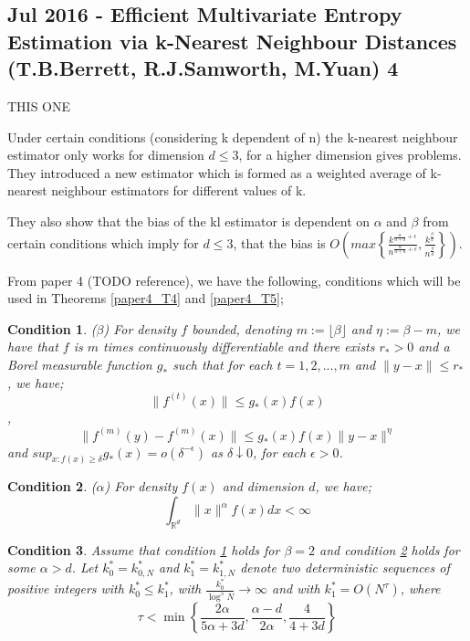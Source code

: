 \documentclass{article}
\newtheorem{remark}{Condition}
\begin{document}
\subsection{Jul 2016 - Efficient Multivariate Entropy Estimation via k-Nearest Neighbour Distances (T.B.Berrett, R.J.Samworth, M.Yuan) 4} THIS ONE

Under certain conditions (considering k dependent of n) the k-nearest neighbour estimator only works for dimension $d \leq 3$, for a higher dimension gives problems. They introduced a new estimator which is formed as a weighted average of k-nearest neighbour estimators for different values of k.

They also show that the bias of the kl estimator is dependent on $\alpha$ and $\beta$ from certain conditions which imply for $d \leq 3$,  that the bias is $O\left(max \left\{ \frac{k^{\frac{\alpha }{\alpha + d} + \epsilon}}{n^{\frac{\alpha}{\alpha + d} + \epsilon}}, \frac{k^{\frac{\beta}{d}}}{n^{\frac{\beta}{d}}} \right\} \right)$.



From paper 4 (TODO reference), we have the following, conditions which will be used in Theorems \ref{paper4_T4} and \ref{paper4_T5};
\begin{remark} ($\beta$) \label{A1}
For density $f$ bounded, denoting $m := \lfloor \beta \rfloor$ and $\eta := \beta -m$, we have that $f$ is $m$ times continuously differentiable and there exists $r_{*} > 0$ and a Borel measurable function $g_{*}$ such that for each $t = 1, 2, ... , m$ and $\|y-x\| \leq r_{*}$, we have;
\begin{equation}
\| f^{(t)} (x) \| \leq g_{*}(x)f(x) \nonumber
\end{equation},
\begin{equation}
\| f^{(m)} (y) - f^{(m)} (x) \| \leq g_{*}(x)f(x) \|y-x\|^{\eta} \nonumber
\end{equation}
and $sup_{x:f(x)\geq \delta} g_{*}(x) = o(\delta^{-\epsilon})$ as $\delta \downarrow 0$, for each $\epsilon > 0$.
\end{remark}

\begin{remark} ($\alpha$) \label{A2}
For density $f(x)$ and dimension $d$, we have;
\begin{equation}
\int_{\mathbb{R}^{d}} \| x \|^{\alpha} f(x) dx < \infty \nonumber
\end{equation}
\end{remark}

\begin{remark} \label{A3}
Assume that condition \ref{A1} holds for $\beta = 2$ and condition \ref{A2} holds for some $\alpha > d$. Let $k_{0}^{*} = k_{0, N}^{*}$ and $k_{1}^{*} = k_{1, N}^{*}$ denote two deterministic sequences of positive integers with $k_{0}^{*} \leq k_{1}^{*}$, with $\frac{k_{0}^{*}}{\log^{5}{N}} \to \infty$ and with $k_{1}^{*} = O(N^{\tau})$, where
\begin{equation}
\tau < \min \left\{ \frac{2 \alpha}{5 \alpha + 3d} , \frac{\alpha - d}{2 \alpha} , \frac{4}{4 + 3d} \right\} \nonumber
\end{equation}
\end{remark}
\end{document}

